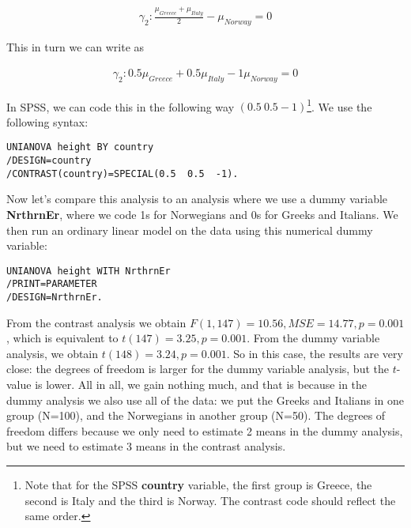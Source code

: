 \begin{eqnarray}
\gamma_2 : \frac{\mu_{Greece} + \mu_{Italy}} {2} - \mu_{Norway}  = 0 
\end{eqnarray}


This in turn we can write as 

\begin{eqnarray}
\gamma_2 : 0.5 \mu_{Greece} + 0.5 \mu_{Italy} - 1 \mu_{Norway}  = 0 
\end{eqnarray}


In SPSS, we can code this in the following way $(0.5 \ 0.5 -1)$\footnote{Note that for the SPSS  \textbf{country} variable, the first group is Greece, the second is Italy and the third is Norway. The contrast code should reflect the same order.}. We use the following syntax:

\begin{verbatim}
UNIANOVA height BY country
/DESIGN=country
/CONTRAST(country)=SPECIAL(0.5  0.5  -1).
\end{verbatim}


Now let's compare this analysis to an analysis where we use a dummy variable \textbf{NrthrnEr}, where we code 1s for Norwegians and 0s for Greeks and Italians. We then run an ordinary linear model on the data using this numerical dummy variable:


\begin{verbatim}
UNIANOVA height WITH NrthrnEr
/PRINT=PARAMETER
/DESIGN=NrthrnEr.
\end{verbatim}

From the contrast analysis we obtain $F(1,147)=10.56, MSE=14.77, p=0.001$, which is equivalent to $t(147)=3.25, p=0.001$. From the dummy variable analysis, we obtain $t(148)= 3.24, p=0.001$. So in this case, the results are very close: the degrees of freedom is larger for the dummy variable analysis, but the $t$-value is lower. All in all, we gain nothing much, and that is because in the dummy analysis we also use all of the data: we put the Greeks and Italians in one group (N=100), and the Norwegians in another group (N=50). The degrees of freedom differs because we only need to estimate 2 means in the dummy analysis, but we need to estimate 3 means in the contrast analysis.

